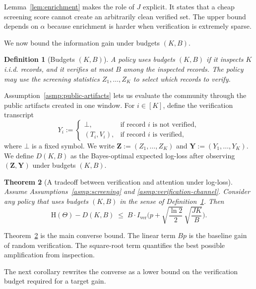 \documentclass[twocolumn]{scholar7}
\newtheorem{theorem}{Theorem}
\newtheorem{definition}[theorem]{Definition}
\newcommand{\Hh}{\mathrm{H}}
\newcommand{\bracks}[1]{\left[#1\right]}
\newcommand{\idx}[1]{\bracks{#1}} %
\begin{document}
Lemma~\ref{lem:enrichment} makes the role of $J$ explicit.
It states that a cheap screening score cannot create an arbitrarily clean verified set.
The upper bound depends on $\alpha$ because enrichment is harder when verification is extremely sparse.

We now bound the information gain under budgets $(K,B)$.

\begin{definition}[Budgets $(K,B)$]
\label{def:budgets}
A policy uses budgets $(K,B)$ if it inspects $K$ i.i.d. records, and it verifies at most $B$ among the inspected records.
The policy may use the screening statistics $Z_1,\dots,Z_K$ to select which records to verify.
\end{definition}

Assumption~\ref{asmp:public-artifacts} lets us evaluate the community through the public artifacts created in one window.
For $i\in\idx{K}$, define the verification transcript
\[
  Y_i:=\begin{cases}
  \bot, & \text{if record $i$ is not verified},\\
  (T_i,V_i), & \text{if record $i$ is verified},
  \end{cases}
\]
where $\bot$ is a fixed symbol.
We write $\bm{Z}:=(Z_1,\dots,Z_K)$ and $\bm{Y}:=(Y_1,\dots,Y_K)$.
We define $D(K,B)$ as the Bayes-optimal expected log-loss after observing $(\bm{Z},\bm{Y})$ under budgets $(K,B)$.

\begin{theorem}[A tradeoff between verification and attention under log-loss]
\label{thm:ver-tradeoff}
Assume Assumptions~\ref{asmp:screening} and \ref{asmp:verification-channel}.
Consider any policy that uses budgets $(K,B)$ in the sense of Definition~\ref{def:budgets}.
Then
\begin{equation}
\label{eq:ver-tradeoff}
\Hh(\Theta)-D(K,B)
\;\le\;
B\cdot I_{\mathrm{ver}}\Bigg(
p + \sqrt{\frac{\ln 2}{2}}\,\sqrt{\frac{JK}{B}}
\Bigg).
\end{equation}
\end{theorem}

Theorem~\ref{thm:ver-tradeoff} is the main converse bound.
The linear term $Bp$ is the baseline gain of random verification.
The square-root term quantifies the best possible amplification from inspection.

The next corollary rewrites the converse as a lower bound on the verification budget required for a target gain.
\end{document}
